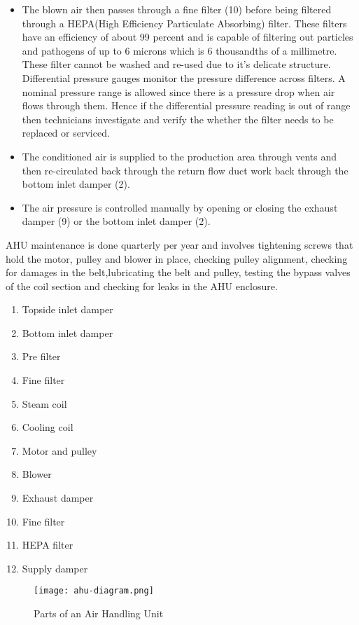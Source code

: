 \documentclass[a4paper,12pt]{article}
\begin{document}
\begin{itemize}
				\item The blown air then passes through a fine filter (10) before being filtered through a HEPA(High Efficiency Particulate Absorbing) filter.
				These filters have an efficiency of about 99 percent and is capable of filtering out particles and pathogens of up to 6 microns which is 6 thousandths of a millimetre. These filter cannot be washed and re-used due to it's delicate structure. Differential pressure gauges monitor the pressure difference across filters. A nominal pressure range is allowed since there is a pressure drop when air flows through them. Hence if the differential pressure reading is out of range then technicians investigate and verify the whether the filter needs to be replaced or serviced.
				\item The conditioned air is supplied to the production area through vents and then re-circulated back through the return flow duct work back through the bottom inlet damper (2).
				\item The air pressure is controlled manually by opening or closing the exhaust damper (9) or the bottom inlet damper (2).
			\end{itemize}
			
			AHU maintenance is done quarterly per year and involves tightening screws that hold the motor, pulley and blower in place, checking pulley alignment, checking for damages in the belt,lubricating the belt and pulley, testing the bypass valves of the coil section and checking for leaks in the AHU enclosure.
			  
			\begin{enumerate}
				\item Topside inlet damper
				\item Bottom inlet damper
				\item Pre filter
				\item Fine filter
				\item Steam coil
				\item Cooling coil
				\item Motor and pulley
				\item Blower
				\item Exhaust damper
				\item Fine filter
				\item HEPA filter
				\item Supply damper
			\end{enumerate}
						
			\begin{figure}[H]
				\centering
				\texttt{[image: ahu-diagram.png]}
				\caption{Parts of an Air Handling Unit}
				\label{fig:ahu}
			\end{figure}
			
\end{document}
